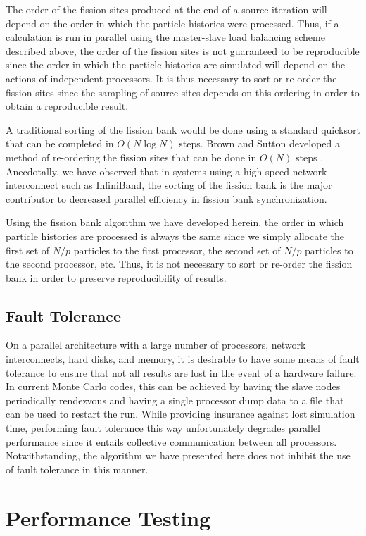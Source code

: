 The order of the fission sites produced at the end of a source
iteration will depend on the order in which the particle histories
were processed. Thus, if a calculation is run in parallel using the
master-slave load balancing scheme described above, the order of the
fission sites is not guaranteed to be reproducible since the order in
which the particle histories are simulated will depend on the actions
of independent processors. It is thus necessary to sort or re-order
the fission sites since the sampling of source sites depends on this
ordering in order to obtain a reproducible result.

A traditional sorting of the fission bank would be done using a
standard quicksort that can be completed in $O(N \log N)$ steps. Brown
and Sutton developed a method of re-ordering the fission sites that
can be done in $O(N)$ steps \cite{brown-sort}. Anecdotally, we have
observed that in systems using a high-speed network interconnect such
as InfiniBand, the sorting of the fission bank is the major
contributor to decreased parallel efficiency in fission bank
synchronization.

Using the fission bank algorithm we have developed herein, the order
in which particle histories are processed is always the same since we
simply allocate the first set of $N/p$ particles to the first
processor, the second set of $N/p$ particles to the second processor,
etc. Thus, it is not necessary to sort or re-order the fission bank in
order to preserve reproducibility of results.

\subsection{Fault Tolerance}

On a parallel architecture with a large number of processors, network
interconnects, hard disks, and memory, it is desirable to have some
means of fault tolerance to ensure that not all results are lost in
the event of a hardware failure. In current Monte Carlo codes, this
can be achieved by having the slave nodes periodically rendezvous and
having a single processor dump data to a file that can be used to
restart the run. While providing insurance against lost simulation
time, performing fault tolerance this way unfortunately degrades
parallel performance since it entails collective communication between
all processors. Notwithstanding, the algorithm we have presented here
does not inhibit the use of fault tolerance in this manner.

\section{Performance Testing}

